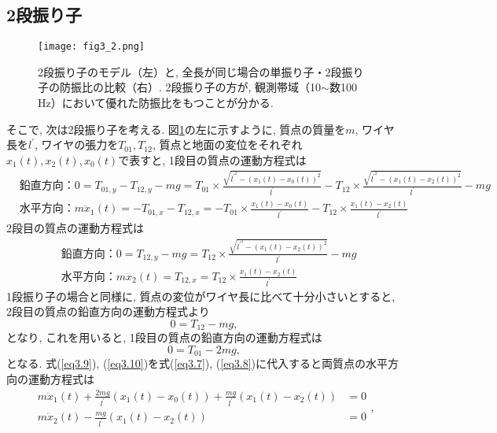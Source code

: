 \subsection{2段振り子}
\begin{figure}[H]
\begin{center}
\texttt{[image: fig3\_2.png]}
\caption[2段振り子のモデルと単振り子との比較]{2段振り子のモデル（左）と, 全長が同じ場合の単振り子・2段振り子の防振比の比較（右）. 2段振り子の方が, 観測帯域（10$\sim$数100 Hz）において優れた防振比をもつことが分かる. }
\label{fig3.2}
\end{center}
\end{figure}
そこで, 次は2段振り子を考える. 図\ref{fig3.2}の左に示すように, 質点の質量を$m$, ワイヤ長を$l^{\prime}$, ワイヤの張力を$T_{01},T_{12}$, 質点と地面の変位をそれぞれ$x_1(t),x_2(t),x_0(t)$で表すと, 1段目の質点の運動方程式は
\begin{equation}
\begin{split}
&鉛直方向：0=T_{01,y}-T_{12,y}-mg=T_{01}\times\frac{\sqrt{l^{\prime^2}-(x_1(t)-x_0(t))^2}}{l^{\prime}}-T_{12}\times\frac{\sqrt{l^{\prime^2}-(x_1(t)-x_2(t))^2}}{l^{\prime}}-mg\\
&水平方向：m\ddot{x}_1(t)=-T_{01,x}-T_{12,x}=-T_{01}\times\frac{x_1(t)-x_0(t)}{l^{\prime}}-T_{12}\times\frac{x_1(t)-x_2(t)}{l^{\prime}}
\end{split}
\label{eq3.7}
\end{equation}
2段目の質点の運動方程式は
\begin{equation}
\begin{split}
&鉛直方向：0=T_{12,y}-mg=T_{12}\times\frac{\sqrt{l^{\prime^2}-(x_1(t)-x_2(t))^2}}{l^{\prime}}-mg\\
&水平方向：m\ddot{x}_2(t)=T_{12,x}=T_{12}\times\frac{x_1(t)-x_2(t)}{l^{\prime}}
\end{split}
\label{eq3.8}
\end{equation}
1段振り子の場合と同様に, 質点の変位がワイヤ長に比べて十分小さいとすると, 2段目の質点の鉛直方向の運動方程式より
\begin{equation}
0=T_{12}-mg,
\label{eq3.9}
\end{equation}
となり, これを用いると, 1段目の質点の鉛直方向の運動方程式は
\begin{equation}
0=T_{01}-2mg,
\label{eq3.10}
\end{equation}
となる. 式(\ref{eq3.9}), (\ref{eq3.10})を式(\ref{eq3.7}), (\ref{eq3.8})に代入すると両質点の水平方向の運動方程式は
\begin{equation}
\begin{split}
m\ddot{x}_1(t)+\frac{2mg}{l^{\prime}}(x_1(t)-x_0(t))+\frac{mg}{l^{\prime}}(x_1(t)-x_2(t))&=0\\
m\ddot{x}_2(t)-\frac{mg}{l^{\prime}}(x_1(t)-x_2(t))&=0
\end{split},
\end{equation}
